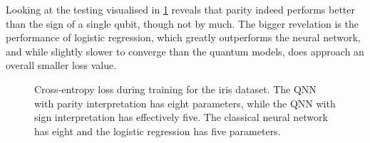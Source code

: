 Looking at the testing visualised in \cref{fig:iris_training_lr} reveals that parity indeed performs better than the sign of a single qubit, though not by much.
The bigger revelation is the performance of logistic regression, which greatly outperforms the neural network, and while slightly slower to converge than the quantum models, does approach an overall smaller loss value.

\begin{figure}
    \centering
    \caption{
        Cross-entropy loss during training for the iris dataset.
        The QNN with parity interpretation has eight parameters, while the QNN with sign interpretation has effectively five.
        The classical neural network has eight and the logistic regression has five parameters.
    }
    \label{fig:iris_training_lr}
\end{figure}
